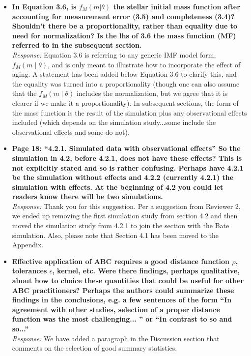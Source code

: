 \documentclass[11pt, oneside]{article}   	%
\newcommand{\jessi}[1]{{\color{blue}[[\textbf{Jessi: }#1]]}}
\newcommand{\chad}[1]{{\color{cyan}[[\textbf{Chad: }#1]]}}
\begin{document}
\begin{itemize}
\item {\bf In Equation 3.6, is $f_M (m|\theta)$ the stellar initial mass function after accounting for measurement error (3.5) and completeness (3.4)? Shouldn't there be a proportionality, rather than equality due to need for normalization? Is the lhs of 3.6 the mass function (MF) referred to in the subsequent section.} \\
\noindent \emph{Response:}  Equation 3.6 is referring to any generic IMF model form, $f_M(m \mid \theta)$, and is only meant to illustrate how to incorporate the effect of aging.  A statement has been added below Equation 3.6 to clarify this, and the equality was turned into a proportionality (though one can also assume that the $f_M(m \mid \theta)$ includes the normalization, but we agree that it is clearer if we make it a proportionality).  In subsequent sections, the form of the mass function is the result of the simulation plus any observational effects included (which depends on the simulation study...some include the observational effects and some do not).  
\bigskip

\item {\bf Page 18: ``4.2.1. Simulated data with observational effects'' So the simulation in 4.2, before 4.2.1, does not have these effects? This is not explicitly stated and so is rather confusing. Perhaps have 4.2.1 be the simulation without effects and 4.2.2 (currently 4.2.1) the simulation with effects. At the beginning of 4.2 you could let readers know there will be two simulations. }\\
\noindent \emph{Response:} Thank you for this suggestion.  Per a suggestion from Reviewer 2, we ended up removing the first simulation study from section 4.2 and then moved the simulation study from 4.2.1 to join the section with the Bate simulation.  Also, please note that Section 4.1 has been moved to the Appendix.
\bigskip

\item {\bf Effective application of ABC requires a good distance function $\rho$, tolerances $\epsilon$, kernel, etc. Were there findings, perhaps qualitative, about how to choice these quantities that could be useful for other ABC practitioners? Perhaps the authors could summarize these findings in the conclusions, e.g. a few sentences of the form ``In agreement with other studies, selection of a proper distance function was the most challenging... '' or ``In contrast to so and so...'' }\\
\noindent \emph{Response:} We have added a paragraph in the Discussion section that comments on the selection of good summary statistics.
\bigskip


\end{itemize}
\end{document}
